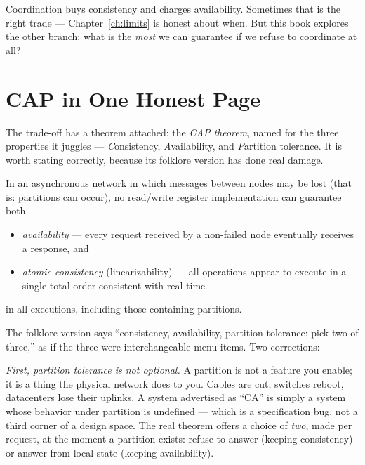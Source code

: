 \documentclass[12pt, a4paper, openright]{book}
\theoremstyle{thmstyle}
\theoremstyle{defstyle}
\newenvironment{thmbox}[1][]{%
  \begin{tcolorbox}[thmbox, title={\ifx\\#1\\Theorem\else#1\fi}]%
}{\end{tcolorbox}}
\begin{document}
Coordination buys consistency and charges availability. Sometimes that
is the right trade --- Chapter~\ref{ch:limits} is honest about when. But
this book explores the other branch: what is the \emph{most} we can
guarantee if we refuse to coordinate at all?

\section{CAP in One Honest Page}

The trade-off has a theorem attached: the \emph{CAP theorem}, named for
the three properties it juggles --- \emph{C}onsistency,
\emph{A}vailability, and \emph{P}artition tolerance. It is worth stating
correctly, because its folklore version has done real damage.

\begin{thmbox}[CAP (Brewer's conjecture; Gilbert--Lynch 2002)]
  In an asynchronous network in which messages between nodes may be lost
  (that is: partitions can occur), no read/write register implementation
  can guarantee both
  \begin{itemize}[nosep]
    \item \emph{availability} --- every request received by a non-failed
      node eventually receives a response, and
    \item \emph{atomic consistency} (linearizability) --- all operations
      appear to execute in a single total order consistent with real
      time
  \end{itemize}
  in all executions, including those containing partitions.
\end{thmbox}

The folklore version says ``consistency, availability, partition
tolerance: pick two of three,'' as if the three were interchangeable
menu items. Two corrections:

\emph{First, partition tolerance is not optional.} A partition is not a
feature you enable; it is a thing the physical network does to you.
Cables are cut, switches reboot, datacenters lose their uplinks. A
system advertised as ``CA'' is simply a system whose behavior under
partition is undefined --- which is a specification bug, not a third
corner of a design space. The real theorem offers a choice of
\emph{two}, made per request, at the moment a partition exists: refuse
to answer (keeping consistency) or answer from local state (keeping
availability).
\end{document}
